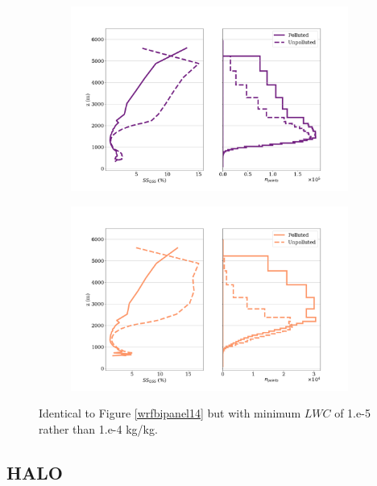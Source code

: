 \documentclass{article}
\begin{document}
\begin{figure}[ht]
	\centering
	\begin{subfigure}{0.7\textwidth}
		\includegraphics[width=\textwidth]{revmywrf/v15_FINAL_bipanel_ss_qss_vs_z_allpts_figure.png}
		\caption{}
		\label{wrfbipanelallptsv15}
	\end{subfigure}
	\begin{subfigure}{0.7\textwidth}
		\includegraphics[width=\textwidth]{revmywrf/v15_FINAL_bipanel_ss_qss_vs_z_up10perc_figure.png}
		\caption{}
		\label{wrfbipanelup50percv15}
	\end{subfigure}
	\caption{Identical to Figure \ref{wrfbipanel14} but with minimum $LWC$ of 1.e-5 rather than 1.e-4 kg/kg.}
	\label{wrfbipanelv15}
\end{figure}
\clearpage
\newpage

\subsection{HALO}
\end{document}
